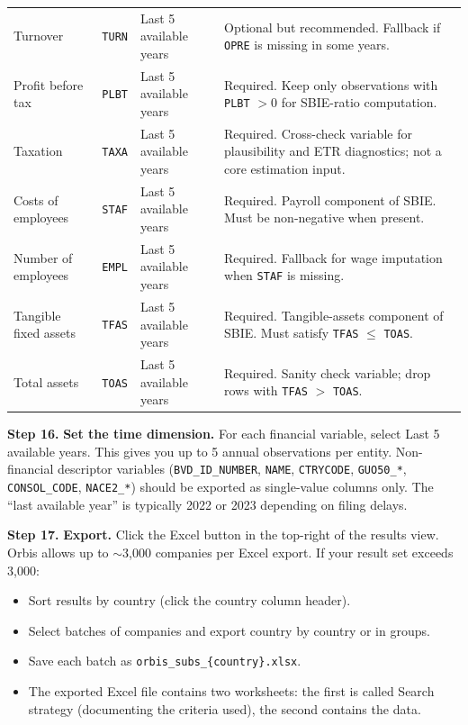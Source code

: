 \documentclass[11pt,a4paper]{article}
\newcommand{\field}[1]{\texttt{#1}}
\newcommand{\menu}[1]{\textsf{#1}}
\newcommand{\step}[1]{\noindent\textbf{Step #1.}\quad}
\begin{document}
\begin{small}
\begin{longtable}{@{}L{3.2cm}L{2.7cm}L{2.1cm}L{6.0cm}@{}}
Turnover & \field{TURN} & Last 5 available years & Optional but recommended. Fallback if \field{OPRE} is missing in some years. \\
Profit before tax & \field{PLBT} & Last 5 available years & Required. Keep only observations with \field{PLBT} $> 0$ for SBIE-ratio computation. \\
Taxation & \field{TAXA} & Last 5 available years & Required. Cross-check variable for plausibility and ETR diagnostics; not a core estimation input. \\
Costs of employees & \field{STAF} & Last 5 available years & Required. Payroll component of SBIE. Must be non-negative when present. \\
Number of employees & \field{EMPL} & Last 5 available years & Required. Fallback for wage imputation when \field{STAF} is missing. \\
Tangible fixed assets & \field{TFAS} & Last 5 available years & Required. Tangible-assets component of SBIE. Must satisfy \field{TFAS} $\leq$ \field{TOAS}. \\
Total assets & \field{TOAS} & Last 5 available years & Required. Sanity check variable; drop rows with \field{TFAS} $>$ \field{TOAS}. \\
\end{longtable}
\end{small}

\step{16} \textbf{Set the time dimension.} For each financial variable, select \menu{Last 5 available years}. This gives you up to 5 annual observations per entity. Non-financial descriptor variables (\field{BVD\_ID\_NUMBER}, \field{NAME}, \field{CTRYCODE}, \field{GUO50\_*}, \field{CONSOL\_CODE}, \field{NACE2\_*}) should be exported as single-value columns only. The ``last available year'' is typically 2022 or 2023 depending on filing delays.

\step{17} \textbf{Export.} Click the \menu{Excel} button in the top-right of the results view. Orbis allows up to $\sim$3,000 companies per Excel export. If your result set exceeds 3,000:
\begin{itemize}[noitemsep]
  \item Sort results by country (click the country column header).
  \item Select batches of companies and export country by country or in groups.
  \item Save each batch as \texttt{orbis\_subs\_\{country\}.xlsx}.
  \item The exported Excel file contains two worksheets: the first is called \menu{Search strategy} (documenting the criteria used), the second contains the data.
\end{itemize}
\end{document}
